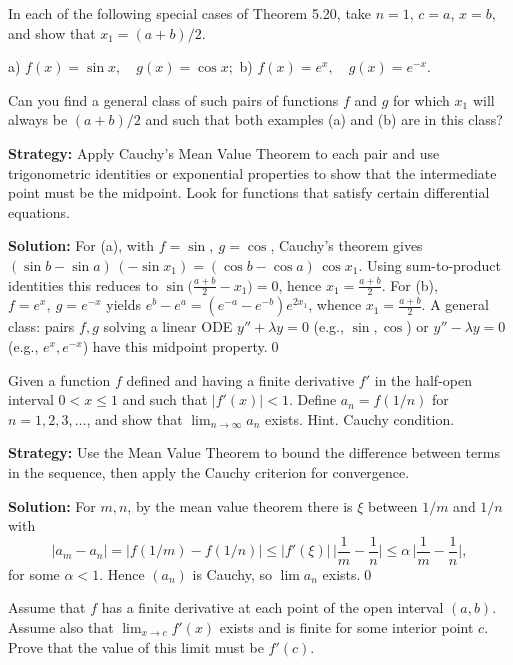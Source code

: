 \begin{problembox}
In each of the following special cases of Theorem 5.20, take \( n = 1 \), \( c = a \), \( x = b \), and show that \( x_1 = (a + b)/2 \).

a) \( f(x) = \sin x, \quad g(x) = \cos x; \) 
b) \( f(x) = e^x, \quad g(x) = e^{-x} \).

Can you find a general class of such pairs of functions \( f \) and \( g \) for which \( x_1 \) will always be \( (a + b)/2 \) and such that both examples (a) and (b) are in this class?
\end{problembox}

\noindent\textbf{Strategy:} Apply Cauchy's Mean Value Theorem to each pair and use trigonometric identities or exponential properties to show that the intermediate point must be the midpoint. Look for functions that satisfy certain differential equations.

\bigskip\noindent\textbf{Solution:}
For (a), with $f=\sin,\ g=\cos$, Cauchy's theorem gives $(\sin b-\sin a)\,(-\sin x_1)=(\cos b-\cos a)\,\cos x_1$. Using sum-to-product identities this reduces to $\sin\big(\tfrac{a+b}{2}-x_1\big)=0$, hence $x_1=\tfrac{a+b}{2}$. For (b), $f=e^x,\ g=e^{-x}$ yields $e^b-e^a=(e^{-a}-e^{-b})e^{2x_1}$, whence $x_1=\tfrac{a+b}{2}$. A general class: pairs $f,g$ solving a linear ODE $y''+\lambda y=0$ (e.g., $\sin,\cos$) or $y''-\lambda y=0$ (e.g., $e^x,e^{-x}$) have this midpoint property.\qed


\begin{problembox}
Given a function \( f \) defined and having a finite derivative \( f' \) in the half-open interval \( 0 < x \leq 1 \) and such that \( |f'(x)| < 1 \). Define \( a_n = f(1/n) \) for \( n = 1, 2, 3, \ldots \), and show that \( \lim_{n \to \infty} a_n \) exists. Hint. Cauchy condition.
\end{problembox}

\noindent\textbf{Strategy:} Use the Mean Value Theorem to bound the difference between terms in the sequence, then apply the Cauchy criterion for convergence.

\bigskip\noindent\textbf{Solution:}
For $m,n$, by the mean value theorem there is $\xi$ between $1/m$ and $1/n$ with
\[|a_m-a_n|=|f(1/m)-f(1/n)|\le |f'(\xi)|\,\Big|\frac1m-\frac1n\Big|\le \alpha\,\Big|\frac1m-\frac1n\Big|,\]
for some $\alpha<1$. Hence $(a_n)$ is Cauchy, so $\lim a_n$ exists.\qed


\begin{problembox}
Assume that \( f \) has a finite derivative at each point of the open interval \( (a, b) \). Assume also that \( \lim_{x \to c} f'(x) \) exists and is finite for some interior point \( c \). Prove that the value of this limit must be \( f'(c) \).
\end{problembox}

